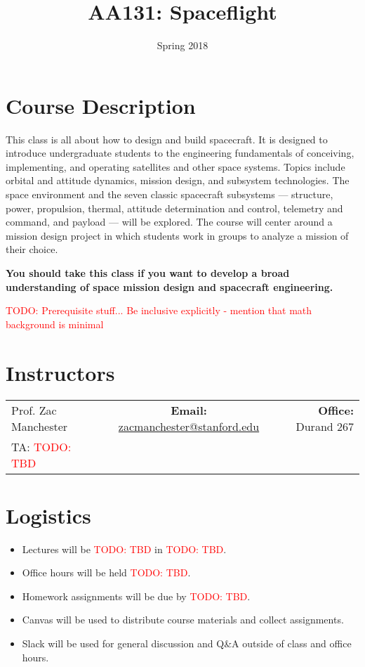 \documentclass[11pt,letterpaper]{article}
\title{AA131: Spaceflight}
\author{Spring 2018}
\date{}
\newcommand{\todo}[1]{\textcolor{red}{TODO: #1}}
\begin{document}
\maketitle

\section*{Course Description}

This class is all about how to design and build spacecraft. It is designed to introduce undergraduate students to the engineering fundamentals of conceiving, implementing, and operating satellites and other space systems. Topics include orbital and attitude dynamics, mission design, and subsystem technologies. The space environment and the seven classic spacecraft subsystems --- structure, power, propulsion, thermal, attitude determination and control, telemetry and command, and payload --- will be explored. The course will center around a mission design project in which students work in groups to analyze a mission of their choice.

\medskip
\noindent
\textbf{You should take this class if you want to develop a broad understanding of space mission design and spacecraft engineering.}

\todo{Prerequisite stuff... Be inclusive explicitly - mention that math background is minimal}

\section*{Instructors}

\begin{center}
\begin{tabular}{l c r}
	Prof. Zac Manchester & \textbf{Email:} \href{mailto:zacmanchester@stanford.edu}{zacmanchester@stanford.edu} & \textbf{Office:} Durand 267 \\
	TA: \todo{TBD}
\end{tabular}
\end{center}

\section*{Logistics}

\begin{itemize}
	\item Lectures will be \todo{TBD} in \todo{TBD}.
	\item Office hours will be held \todo{TBD}.
	\item Homework assignments will be due by \todo{TBD}.
	\item Canvas will be used to distribute course materials and collect assignments.
	\item Slack will be used for general discussion and Q\&A outside of class and office hours.
\end{itemize}
\end{document}

